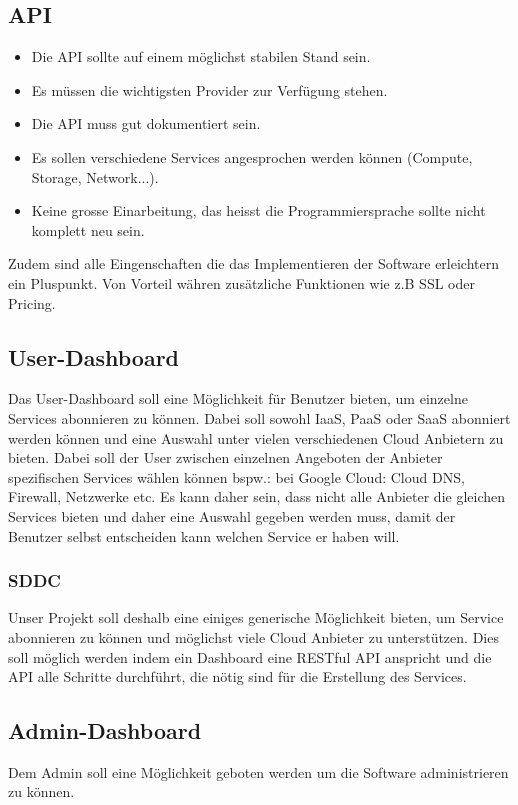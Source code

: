 

\subsection{API}
\begin{itemize}
\item Die API sollte auf einem möglichst stabilen Stand sein.
\item Es müssen die wichtigsten Provider zur Verfügung stehen.
\item Die API muss gut dokumentiert sein.
\item Es sollen verschiedene Services angesprochen werden können (Compute, Storage, Network...).
\item Keine grosse Einarbeitung, das heisst die Programmiersprache sollte nicht komplett neu sein.
\end{itemize}
\newline
Zudem sind alle Eingenschaften die das Implementieren der Software erleichtern ein 
Pluspunkt. Von Vorteil währen zusätzliche Funktionen wie z.B SSL oder Pricing. 

\subsection{User-Dashboard}
Das User-Dashboard soll eine Möglichkeit für Benutzer bieten, um einzelne Services 
abonnieren zu können.
Dabei soll sowohl \ac{IaaS}, \ac{PaaS} oder \ac{SaaS} abonniert werden können und eine Auswahl 
 unter vielen verschiedenen Cloud Anbietern zu bieten.
Dabei soll der User zwischen einzelnen Angeboten der Anbieter spezifischen 
Services wählen können bspw.: bei Google Cloud: Cloud DNS, Firewall, Netzwerke etc.
Es kann daher sein, dass nicht alle Anbieter die gleichen Services bieten und 
daher eine Auswahl gegeben werden muss, damit der Benutzer selbst entscheiden 
kann welchen Service er haben will.

\subsubsection{SDDC}
Unser Projekt soll deshalb eine einiges generische Möglichkeit bieten, um 
Service abonnieren zu können und möglichst viele Cloud Anbieter zu 
unterstützen.
Dies soll möglich werden indem ein Dashboard eine RESTful API anspricht und 
die API alle Schritte durchführt, die nötig sind für die Erstellung des 
Services.

\subsection{Admin-Dashboard}
Dem Admin soll eine Möglichkeit geboten werden um die Software administrieren zu 
können.
